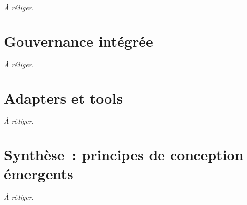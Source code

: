 \textit{\`A r\'ediger.}

\section{Gouvernance int\'egr\'ee}\label{sec:conception-gouvernance}

\textit{\`A r\'ediger.}

\section{Adapters et tools}\label{sec:conception-adapters}

\textit{\`A r\'ediger.}

\section{Synth\`ese~: principes de conception \'emergents}\label{sec:conception-synthese}

\textit{\`A r\'ediger.}
